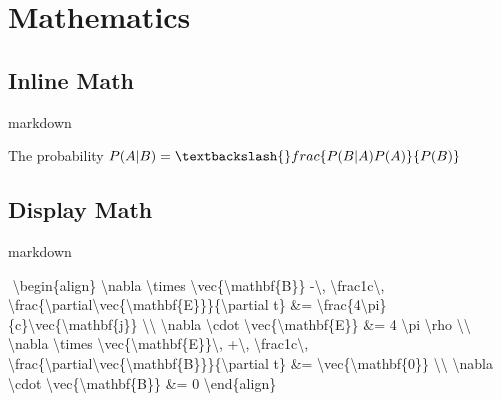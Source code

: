 \documentclass[
  11pt,
  letterpaper,
]{book}
\newenvironment{Shaded}{\begin{snugshade}}{\end{snugshade}}
\newcommand{\NormalTok}[1]{\textcolor[rgb]{0.00,0.23,0.31}{#1}}
\newcommand{\SpecialCharTok}[1]{\textcolor[rgb]{0.37,0.37,0.37}{#1}}
\begin{document}
\section*{Mathematics}\label{mathematics}


\subsection*{Inline Math}\label{inline-math}

markdown

\begin{Shaded}
\begin{Highlighting}[]
\NormalTok{The probability $P(A|B) = \textbackslash{}frac\{P(B|A)P(A)\}\{P(B)\}$}
\end{Highlighting}
\end{Shaded}

\subsection*{Display Math}\label{display-math}

markdown

\begin{Shaded}
\begin{Highlighting}[]
\NormalTok{$$}
\NormalTok{\textbackslash{}begin\{align\}}
\NormalTok{\textbackslash{}nabla \textbackslash{}times \textbackslash{}vec\{\textbackslash{}mathbf\{B\}\} {-}\textbackslash{}, \textbackslash{}frac1c\textbackslash{}, \textbackslash{}frac\{\textbackslash{}partial\textbackslash{}vec\{\textbackslash{}mathbf\{E\}\}\}\{\textbackslash{}partial t\} \&= \textbackslash{}frac\{4\textbackslash{}pi\}\{c\}\textbackslash{}vec\{\textbackslash{}mathbf\{j\}\} }\SpecialCharTok{\textbackslash{}\textbackslash{}}
\NormalTok{\textbackslash{}nabla \textbackslash{}cdot \textbackslash{}vec\{\textbackslash{}mathbf\{E\}\} \&= 4 \textbackslash{}pi \textbackslash{}rho }\SpecialCharTok{\textbackslash{}\textbackslash{}}
\NormalTok{\textbackslash{}nabla \textbackslash{}times \textbackslash{}vec\{\textbackslash{}mathbf\{E\}\}\textbackslash{}, +\textbackslash{}, \textbackslash{}frac1c\textbackslash{}, \textbackslash{}frac\{\textbackslash{}partial\textbackslash{}vec\{\textbackslash{}mathbf\{B\}\}\}\{\textbackslash{}partial t\} \&= \textbackslash{}vec\{\textbackslash{}mathbf\{0\}\} }\SpecialCharTok{\textbackslash{}\textbackslash{}}
\NormalTok{\textbackslash{}nabla \textbackslash{}cdot \textbackslash{}vec\{\textbackslash{}mathbf\{B\}\} \&= 0}
\NormalTok{\textbackslash{}end\{align\}}
\NormalTok{$$}
\end{Highlighting}
\end{Shaded}
\end{document}
